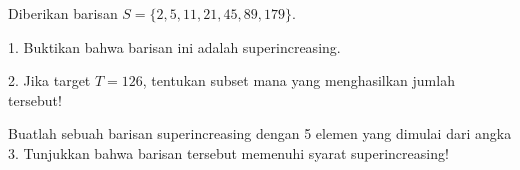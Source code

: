\begin{aktivitas}
  \item Diberikan barisan $S = \{2, 5, 11, 21, 45, 89, 179\}$.
  \item 1. Buktikan bahwa barisan ini adalah superincreasing.
  \item 2. Jika target $T = 126$, tentukan subset mana yang menghasilkan jumlah tersebut!
\end{aktivitas}

\begin{latihan}
  \item Buatlah sebuah barisan superincreasing dengan 5 elemen yang dimulai dari angka 3. Tunjukkan bahwa barisan tersebut memenuhi syarat superincreasing!
\end{latihan}

